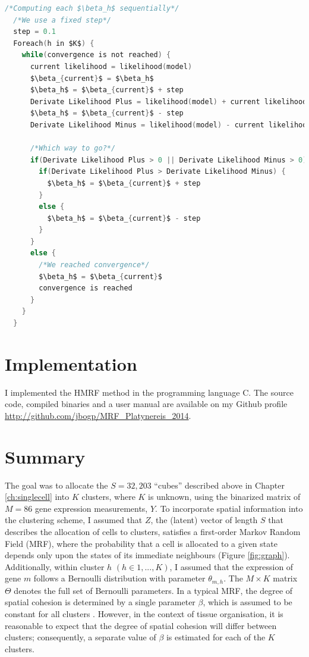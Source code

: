 \begin{lstlisting}[mathescape,caption=Gradient ascent algorithm in C pseudo-code,label=algo:grad,language=C]
/*Computing each $\beta_h$ sequentially*/
  /*We use a fixed step*/
  step = 0.1
  Foreach(h in $K$) {
    while(convergence is not reached) {
      current likelihood = likelihood(model)
      $\beta_{current}$ = $\beta_h$
      $\beta_h$ = $\beta_{current}$ + step
      Derivate Likelihood Plus = likelihood(model) + current likelihood
      $\beta_h$ = $\beta_{current}$ - step
      Derivate Likelihood Minus = likelihood(model) - current likelihood
      
      /*Which way to go?*/
      if(Derivate Likelihood Plus > 0 || Derivate Likelihood Minus > 0) {
        if(Derivate Likelihood Plus > Derivate Likelihood Minus) {
          $\beta_h$ = $\beta_{current}$ + step
        }
        else {
          $\beta_h$ = $\beta_{current}$ - step
        }
      }
      else {
        /*We reached convergence*/
        $\beta_h$ = $\beta_{current}$
        convergence is reached
      }
    }
  }
\end{lstlisting}

\section{Implementation}
I implemented the HMRF method in the programming language C. The source code, compiled binaries and a user manual are available on my Github profile \url{http://github.com/jbogp/MRF_Platynereis_2014}.

\section{Summary}
The goal was to allocate the $S=32,203$ ``cubes'' described above in Chapter \ref{ch:singlecell} into $K$ clusters, where $K$ is unknown, using the binarized matrix of $M=86$ gene expression measurements, $Y$. To incorporate spatial information into the clustering scheme, I assumed that $Z$, the (latent) vector of length $S$ that describes the allocation of cells to clusters, satisfies a first-order Markov Random Field (MRF), where the probability that a cell is allocated to a given state depends only upon the states of its immediate neighbours (Figure \ref{fig:graph}). Additionally, within cluster $h$ $(h \in {1,...,K})$, I assumed that the expression of gene $m$ follows a Bernoulli distribution with parameter $\theta_{m,h}$. The $M \times K$ matrix  $\Theta$ denotes the full set of Bernoulli parameters. In a typical MRF, the degree of spatial cohesion is determined by a single parameter $\beta$, which is assumed to be constant for all clusters \citep{subudhi14,zhang14}. However, in the context of tissue organisation, it is reasonable to expect that the degree of spatial cohesion will differ between clusters; consequently,  a separate value of $\beta$ is estimated for each of the $K$ clusters.\\

